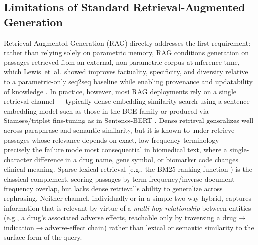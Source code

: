 \documentclass[conference]{IEEEtran}
\begin{document}
\subsection{Limitations of Standard Retrieval-Augmented Generation}
Retrieval-Augmented Generation (RAG) directly addresses the first requirement: rather than relying solely on parametric memory, RAG conditions generation on passages retrieved from an external, non-parametric corpus at inference time, which Lewis~et~al.\ showed improves factuality, specificity, and diversity relative to a parametric-only seq2seq baseline while enabling provenance and updatability of knowledge \cite{lewis2020retrieval}. In practice, however, most RAG deployments rely on a single retrieval channel --- typically dense embedding similarity search using a sentence-embedding model such as those in the BGE family \cite{xiao2023cpack} or produced via Siamese/triplet fine-tuning as in Sentence-BERT \cite{reimers2019sentencebert}. Dense retrieval generalizes well across paraphrase and semantic similarity, but it is known to under-retrieve passages whose relevance depends on exact, low-frequency terminology --- precisely the failure mode most consequential in biomedical text, where a single-character difference in a drug name, gene symbol, or biomarker code changes clinical meaning. Sparse lexical retrieval (e.g., the BM25 ranking function \cite{robertson2009probabilistic}) is the classical complement, scoring passages by term-frequency/inverse-document-frequency overlap, but lacks dense retrieval's ability to generalize across rephrasing. Neither channel, individually or in a simple two-way hybrid, captures information that is relevant by virtue of a \emph{multi-hop relationship} between entities (e.g., a drug's associated adverse effects, reachable only by traversing a drug$\rightarrow$indication$\rightarrow$adverse-effect chain) rather than lexical or semantic similarity to the surface form of the query.
\end{document}
